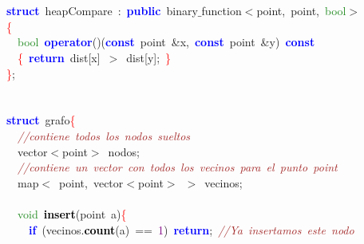 \documentclass[10pt,a4paper,twoside]{article}
\begin{document}
{{{{{\mbox{} \\
\mbox{} \\
\mbox{}\textbf{\textcolor{Blue}{struct}}\ heapCompare\ \textcolor{BrickRed}{:}\ \textbf{\textcolor{Blue}{public}}\ binary$\_$function\textcolor{BrickRed}{$<$}point\textcolor{BrickRed}{,}\ point\textcolor{BrickRed}{,}\ \textcolor{ForestGreen}{bool}\textcolor{BrickRed}{$>$} \\
\mbox{}\textcolor{Red}{\{} \\
\mbox{}\ \ \textcolor{ForestGreen}{bool}\ \textbf{\textcolor{Blue}{operator}}\textcolor{BrickRed}{()(}\textbf{\textcolor{Blue}{const}}\ point\ \textcolor{BrickRed}{\&}x\textcolor{BrickRed}{,}\ \textbf{\textcolor{Blue}{const}}\ point\ \textcolor{BrickRed}{\&}y\textcolor{BrickRed}{)}\ \textbf{\textcolor{Blue}{const}} \\
\mbox{}\ \ \textcolor{Red}{\{}\ \textbf{\textcolor{Blue}{return}}\ dist\textcolor{BrickRed}{[}x\textcolor{BrickRed}{]}\ \textcolor{BrickRed}{$>$}\ dist\textcolor{BrickRed}{[}y\textcolor{BrickRed}{];}\ \textcolor{Red}{\}} \\
\mbox{}\textcolor{Red}{\}}\textcolor{BrickRed}{;} \\
\mbox{} \\
\mbox{} \\
\mbox{}\textbf{\textcolor{Blue}{struct}}\ grafo\textcolor{Red}{\{} \\
\mbox{}\ \ \textit{\textcolor{Brown}{//contiene\ todos\ los\ nodos\ sueltos}} \\
\mbox{}\ \ vector\textcolor{BrickRed}{$<$}point\textcolor{BrickRed}{$>$}\ nodos\textcolor{BrickRed}{;} \\
\mbox{}\ \ \textit{\textcolor{Brown}{//contiene\ un\ vector\ con\ todos\ los\ vecinos\ para\ el\ punto\ point}} \\
\mbox{}\ \ map\textcolor{BrickRed}{$<$}\ point\textcolor{BrickRed}{,}\ vector\textcolor{BrickRed}{$<$}point\textcolor{BrickRed}{$>$}\ \textcolor{BrickRed}{$>$}\ vecinos\textcolor{BrickRed}{;} \\
\mbox{} \\
\mbox{}\ \ \textcolor{ForestGreen}{void}\ \textbf{\textcolor{Black}{insert}}\textcolor{BrickRed}{(}point\ a\textcolor{BrickRed}{)}\textcolor{Red}{\{} \\
\mbox{}\ \ \ \ \textbf{\textcolor{Blue}{if}}\ \textcolor{BrickRed}{(}vecinos\textcolor{BrickRed}{.}\textbf{\textcolor{Black}{count}}\textcolor{BrickRed}{(}a\textcolor{BrickRed}{)}\ \textcolor{BrickRed}{==}\ \textcolor{Purple}{1}\textcolor{BrickRed}{)}\ \textbf{\textcolor{Blue}{return}}\textcolor{BrickRed}{;}\ \textit{\textcolor{Brown}{//Ya\ insertamos\ este\ nodo}} \\
}}}}}
\end{document}
